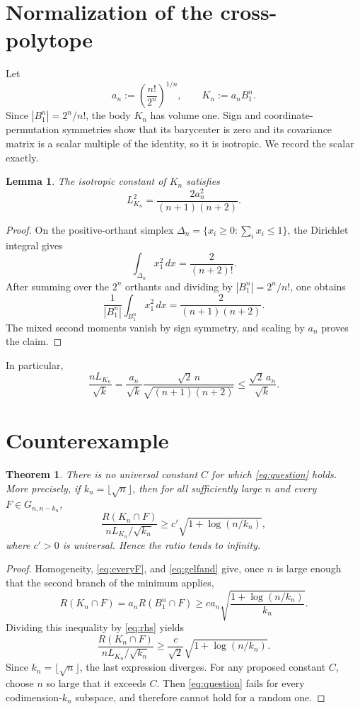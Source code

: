 \documentclass[11pt]{article}
\newtheorem{theorem}{Theorem}
\newtheorem{lemma}{Lemma}
\begin{document}
\section{Normalization of the cross-polytope}

Let
\[
 a_n:=\left(\frac{n!}{2^n}\right)^{1/n},
 \qquad K_n:=a_n B_1^n.
\]
Since $|B_1^n|=2^n/n!$, the body $K_n$ has volume one.  Sign and
coordinate-permutation symmetries show that its barycenter is zero and
its covariance matrix is a scalar multiple of the identity, so it is
isotropic.  We record the scalar exactly.

\begin{lemma}\label{lem:isotropic}
The isotropic constant of $K_n$ satisfies
\[
 L_{K_n}^2=\frac{2a_n^2}{(n+1)(n+2)}.
\]
\end{lemma}

\begin{proof}
On the positive-orthant simplex
$\Delta_n=\{x_i\ge0:\sum_i x_i\le1\}$, the Dirichlet integral gives
\[
 \int_{\Delta_n}x_1^2\,dx=\frac{2}{(n+2)!}.
\]
After summing over the $2^n$ orthants and dividing by
$|B_1^n|=2^n/n!$, one obtains
\[
 \frac1{|B_1^n|}\int_{B_1^n}x_1^2\,dx
 =\frac{2}{(n+1)(n+2)}.
\]
The mixed second moments vanish by sign symmetry, and scaling by $a_n$
proves the claim.
\end{proof}

In particular,
\begin{equation}\label{eq:rhs}
 \frac{nL_{K_n}}{\sqrt k}
 =\frac{a_n}{\sqrt k}
   \frac{\sqrt2\,n}{\sqrt{(n+1)(n+2)}}
 \le \frac{\sqrt2\,a_n}{\sqrt k}.
\end{equation}

\section{Counterexample}

\begin{theorem}\label{thm:counterexample}
There is no universal constant $C$ for which \eqref{eq:question}
holds.  More precisely, if $k_n=\lfloor\sqrt n\rfloor$, then for all
sufficiently large $n$ and every $F\in G_{n,n-k_n}$,
\[
 \frac{R(K_n\cap F)}{nL_{K_n}/\sqrt{k_n}}
 \ge c'\sqrt{1+\log(n/k_n)},
\]
where $c'>0$ is universal.  Hence the ratio tends to infinity.
\end{theorem}

\begin{proof}
Homogeneity, \eqref{eq:everyF}, and \eqref{eq:gelfand} give, once
$n$ is large enough that the second branch of the minimum applies,
\[
 R(K_n\cap F)
 =a_nR(B_1^n\cap F)
 \ge c a_n\sqrt{\frac{1+\log(n/k_n)}{k_n}}.
\]
Dividing this inequality by \eqref{eq:rhs} yields
\[
 \frac{R(K_n\cap F)}{nL_{K_n}/\sqrt{k_n}}
 \ge \frac{c}{\sqrt2}\sqrt{1+\log(n/k_n)}.
\]
Since $k_n=\lfloor\sqrt n\rfloor$, the last expression diverges.
For any proposed constant $C$, choose $n$ so large that it exceeds
$C$.  Then \eqref{eq:question} fails for every codimension-$k_n$
subspace, and therefore cannot hold for a random one.
\end{proof}
\end{document}
